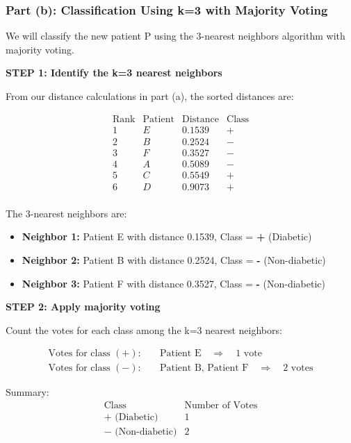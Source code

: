 \documentclass[12pt]{article}
\begin{document}
\subsubsection{Part (b): Classification Using k=3 with Majority Voting}

\begin{solution}
We will classify the new patient P using the 3-nearest neighbors algorithm with majority voting.

\textbf{STEP 1: Identify the k=3 nearest neighbors}

From our distance calculations in part (a), the sorted distances are:

\[
\begin{array}{c|c|c|c}
\text{Rank} & \text{Patient} & \text{Distance} & \text{Class} \\
\hline
1 & E & 0.1539 & + \\
2 & B & 0.2524 & - \\
3 & F & 0.3527 & - \\
4 & A & 0.5089 & - \\
5 & C & 0.5549 & + \\
6 & D & 0.9073 & + \\
\end{array}
\]

The 3-nearest neighbors are:
\begin{itemize}
    \item \textbf{Neighbor 1:} Patient E with distance 0.1539, Class = \textbf{+} (Diabetic)
    \item \textbf{Neighbor 2:} Patient B with distance 0.2524, Class = \textbf{-} (Non-diabetic)
    \item \textbf{Neighbor 3:} Patient F with distance 0.3527, Class = \textbf{-} (Non-diabetic)
\end{itemize}

\textbf{STEP 2: Apply majority voting}

Count the votes for each class among the k=3 nearest neighbors:

\begin{align*}
\text{Votes for class } (+): \quad &\text{Patient E} \quad \Rightarrow \quad 1 \text{ vote} \\
\text{Votes for class } (-): \quad &\text{Patient B, Patient F} \quad \Rightarrow \quad 2 \text{ votes}
\end{align*}

Summary:
\[
\begin{array}{c|c}
\text{Class} & \text{Number of Votes} \\
\hline
+ \text{ (Diabetic)} & 1 \\
- \text{ (Non-diabetic)} & 2 \\
\end{array}
\]


\end{solution}
\end{document}
